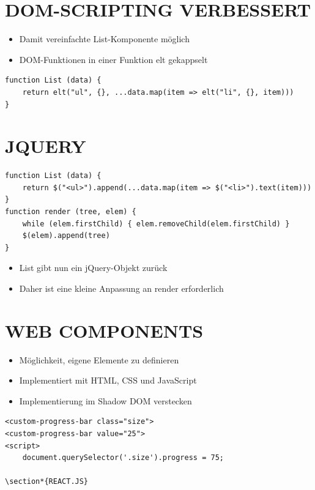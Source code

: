 \section*{DOM-SCRIPTING VERBESSERT}
\begin{itemize}
  \item Damit vereinfachte List-Komponente möglich
  \item DOM-Funktionen in einer Funktion elt gekappselt
\end{itemize}

\begin{verbatim}
function List (data) {
    return elt("ul", {}, ...data.map(item => elt("li", {}, item)))
}
\end{verbatim}

\section*{JQUERY}
\begin{verbatim}
function List (data) {
    return $("<ul>").append(...data.map(item => $("<li>").text(item)))
}
function render (tree, elem) {
    while (elem.firstChild) { elem.removeChild(elem.firstChild) }
    $(elem).append(tree)
}
\end{verbatim}

\begin{itemize}
  \item List gibt nun ein jQuery-Objekt zurück
  \item Daher ist eine kleine Anpassung an render erforderlich
\end{itemize}

\section*{WEB COMPONENTS}
\begin{itemize}
  \item Möglichkeit, eigene Elemente zu definieren
  \item Implementiert mit HTML, CSS und JavaScript
  \item Implementierung im Shadow DOM verstecken
\end{itemize}

\begin{verbatim}
<custom-progress-bar class="size">
<custom-progress-bar value="25">
<script>
    document.querySelector('.size').progress = 75;

\section*{REACT.JS}
\end{verbatim}

